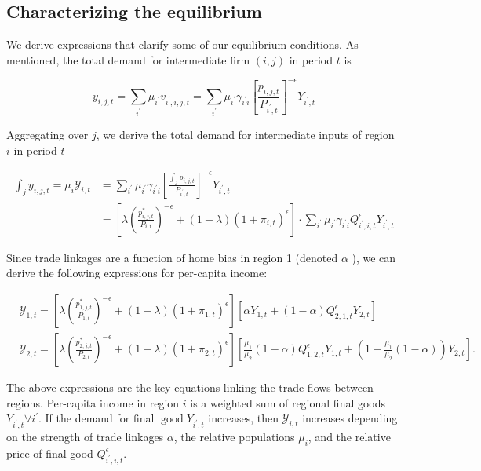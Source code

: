 \documentclass[\latexroot/\projectname]{subfiles}
\begin{document}
\subsection{Characterizing the equilibrium}
We derive expressions that clarify some of our equilibrium conditions. As mentioned, the total demand for intermediate firm $(i, j)$ in period $t$ is

$$
y_{i, j, t}=\sum_{i^{\prime}} \mu_{i^{\prime}} v_{i^{\prime}, i, j, t}=\sum_{i^{\prime}} \mu_{i^{\prime}} \gamma_{i^{\prime} i}\left[\frac{p_{i, j, t}}{P_{i^{\prime}, t}}\right]^{-\epsilon} Y_{i^{\prime}, t}
$$

Aggregating over $j$, we derive the total demand for intermediate inputs of region $i$ in period $t$


\begin{align*}
\int_{j} y_{i, j, t}=\mu_{i} \mathcal{Y}_{i, t} & =\sum_{i^{\prime}} \mu_{i^{\prime}} \gamma_{i^{\prime} i}\left[\frac{\int_{j} p_{i, j, t}}{P_{i^{\prime}, t}}\right]^{-\epsilon} Y_{i^{\prime}, t}  \tag{4.23}\\
& =\left[\lambda\left(\frac{p_{i, j, t}^{*}}{P_{i, t}}\right)^{-\epsilon}+(1-\lambda)\left(1+\pi_{i, t}\right)^{\epsilon}\right] \cdot \sum_{i^{\prime}} \mu_{i^{\prime}} \gamma_{i^{\prime} i} Q_{i^{\prime}, i, t}^{\epsilon} Y_{i^{\prime}, t} \tag{4.24}
\end{align*}


Since trade linkages are a function of home bias in region 1 (denoted $\alpha$ ), we can derive the following expressions for per-capita income:

$$
\begin{aligned}
& \mathcal{Y}_{1, t}=\left[\lambda\left(\frac{p_{1, j, t}^{*}}{P_{1, t}}\right)^{-\epsilon}+(1-\lambda)\left(1+\pi_{1, t}\right)^{\epsilon}\right]\left[\alpha Y_{1, t}+(1-\alpha) Q_{2,1, t}^{\epsilon} Y_{2, t}\right] \\
& \mathcal{Y}_{2, t}=\left[\lambda\left(\frac{p_{2, j, t}^{*}}{P_{2, t}}\right)^{-\epsilon}+(1-\lambda)\left(1+\pi_{2, t}\right)^{\epsilon}\right]\left[\frac{\mu_{1}}{\mu_{2}}(1-\alpha) Q_{1,2, t}^{\epsilon} Y_{1, t}+\left(1-\frac{\mu_{1}}{\mu_{2}}(1-\alpha)\right) Y_{2, t}\right] .
\end{aligned}
$$

The above expressions are the key equations linking the trade flows between regions. Per-capita income in region $i$ is a weighted sum of regional final goods $Y_{i^{\prime}, t} \forall i^{\prime}$. If the demand for final $\operatorname{good} Y_{i^{\prime}, t}$ increases, then $\mathcal{Y}_{i, t}$ increases depending on the strength of trade linkages $\alpha$, the relative populations $\mu_{i}$, and the relative price of final good $Q_{i^{\prime}, i, t}^{\epsilon}$.
\end{document}
